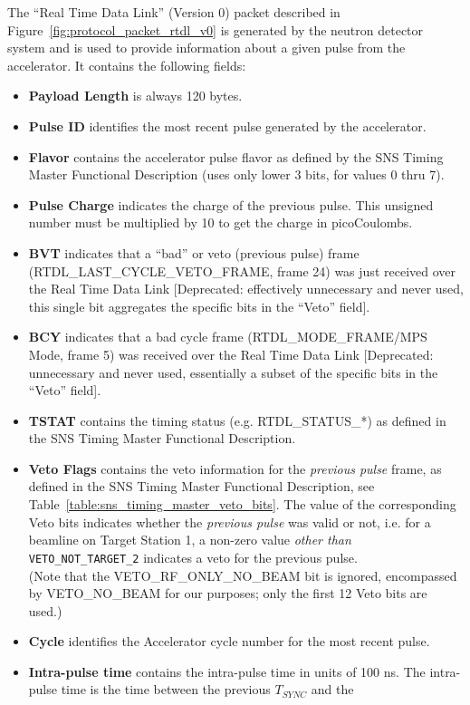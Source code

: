 The ``Real Time Data Link'' (Version 0) packet described in
Figure~\ref{fig:protocol_packet_rtdl_v0} is generated by the neutron
detector system and is used to provide information about a given pulse
from the accelerator.  It contains the following fields:
\begin{itemize}
\item{\bf Payload Length} is always 120 bytes.
\item{\bf Pulse ID} identifies the most recent pulse generated by the
accelerator.
\item{\bf Flavor} contains the accelerator pulse flavor as defined by
the SNS Timing Master Functional Description
(uses only lower 3 bits, for values 0 thru 7).
\item{\bf Pulse Charge} indicates the charge of the previous pulse. This
unsigned number must be multiplied by 10 to get the charge in picoCoulombs.
\item{\bf BVT} indicates that a ``bad'' or veto (previous pulse) frame
(RTDL\_LAST\_CYCLE\_VETO\_FRAME, frame 24) was just received over the
Real Time Data Link [Deprecated: effectively unnecessary and never used,
this single bit aggregates the specific bits in the ``Veto'' field].
\item{\bf BCY} indicates that a bad cycle frame
(RTDL\_MODE\_FRAME/MPS Mode, frame 5) was received over the
Real Time Data Link
[Deprecated: unnecessary and never used, essentially a subset of the
specific bits in the ``Veto'' field].
\item{\bf TSTAT} contains the timing status
(e.g. RTDL\_STATUS\_*) as defined in the SNS Timing Master
Functional Description.
\item{\bf Veto Flags} contains the veto information
for the {\it previous pulse} frame,
as defined in the SNS Timing Master Functional Description,
see Table~\ref{table:sns_timing_master_veto_bits}.
The value of the corresponding Veto bits indicates whether the
{\it previous pulse} was valid or not,
i.e. for a beamline on Target Station 1,
a non-zero value {\it other than } {\tt VETO\_NOT\_TARGET\_2}
indicates a veto for the previous pulse. \\
(Note that the VETO\_RF\_ONLY\_NO\_BEAM bit is ignored,
encompassed by VETO\_NO\_BEAM for our purposes;
only the first 12 Veto bits are used.)
\item{\bf Cycle} identifies the Accelerator cycle number for the most
recent pulse.
\item{\bf Intra-pulse time} contains the intra-pulse time in units of 100 ns.
The intra-pulse time is the time between the previous $T_{SYNC}$ and the

\end{itemize}
